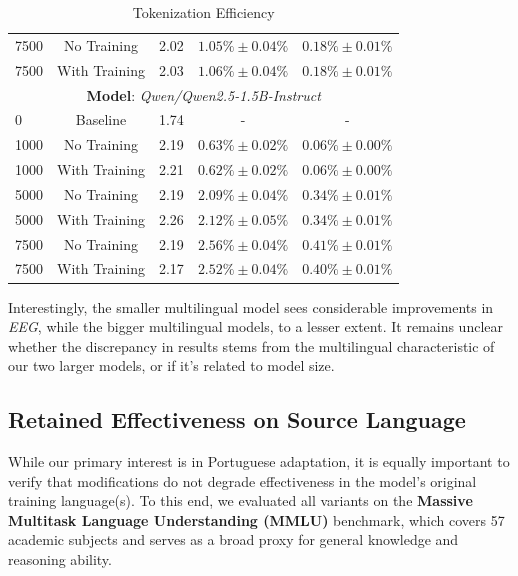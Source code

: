 \begin{table}[h]
\begin{tabular}{lcccc}
7500 &    No Training &         2.02 &   $1.05\% \pm 0.04\%$ &  $ 0.18\% \pm 0.01\% $ \\
7500 &  With Training &         2.03 &   $1.06\% \pm 0.04\%$ &  $ 0.18\% \pm 0.01\% $ \\
\midrule
\multicolumn{5}{c}{\textbf{Model}: \emph{Qwen/Qwen2.5-1.5B-Instruct}} \\ 
   0 &       Baseline &         1.74 &             -         &                     - \\
1000 &    No Training &         2.19 &   $0.63\% \pm 0.02\%$ &  $ 0.06\% \pm 0.00\% $ \\
1000 &  With Training &         2.21 &   $0.62\% \pm 0.02\%$ &  $ 0.06\% \pm 0.00\% $ \\
5000 &    No Training &         2.19 &   $2.09\% \pm 0.04\%$ &  $ 0.34\% \pm 0.01\% $ \\
5000 &  With Training &         2.26 &   $2.12\% \pm 0.05\%$ &  $ 0.34\% \pm 0.01\% $ \\
7500 &    No Training &         2.19 &   $2.56\% \pm 0.04\%$ &  $ 0.41\% \pm 0.01\% $ \\
7500 &  With Training &         2.17 &   $2.52\% \pm 0.04\%$ &  $ 0.40\% \pm 0.01\% $ \\
\bottomrule
\end{tabular}
\caption{Tokenization Efficiency}
\label{tab:fertility_results}
\end{table}

\newpage

Interestingly, the smaller multilingual model sees considerable improvements in \textit{EEG}, while the bigger multilingual models, to a lesser extent. It remains unclear whether the discrepancy in results stems from the multilingual characteristic of our two larger models, or if it's related to model size.

\subsection{Retained Effectiveness on Source Language}

While our primary interest is in Portuguese adaptation, it is equally important to verify that modifications do not degrade effectiveness in the model’s original training language(s). To this end, we evaluated all variants on the \textbf{Massive Multitask Language Understanding (MMLU)} benchmark, which covers 57 academic subjects and serves as a broad proxy for general knowledge and reasoning ability.

